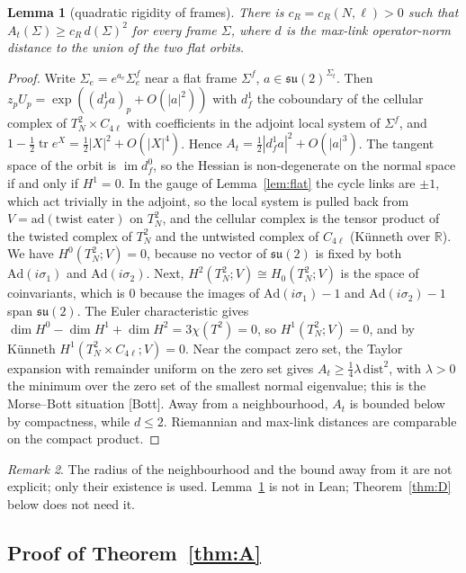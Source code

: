 \documentclass[11pt,a4paper]{article}
\newtheorem{lemma}{Lemma}[section]
\theoremstyle{definition}
\theoremstyle{remark}
\newtheorem{remark}[lemma]{Remark}
\newcommand{\tr}{\operatorname{tr}}
\begin{document}
\begin{lemma}[quadratic rigidity of frames]\label{lem:rigid}
There is $c_R=c_R(N,\ell)>0$ such that $A_t(\Sigma)\ge c_R\,d(\Sigma)^2$ for every frame $\Sigma$, where $d$ is the max-link operator-norm distance to the union of the two flat orbits.
\end{lemma}
\begin{proof}
Write $\Sigma_e=e^{a_e}\Sigma^f_e$ near a flat frame $\Sigma^f$, $a\in\mathfrak{su}(2)^{\Sigma_t}$.
Then $z_pU_p=\exp((d^1_fa)_p+O(|a|^2))$ with $d^1_f$ the coboundary of the cellular complex of $T^2_N\times C_{4\ell}$ with coefficients in the adjoint local system of $\Sigma^f$, and $1-\frac12\tr e^X=\frac12|X|^2+O(|X|^4)$.
Hence $A_t=\frac12|d^1_fa|^2+O(|a|^3)$.
The tangent space of the orbit is $\operatorname{im}d^0_f$, so the Hessian is non-degenerate on the normal space if and only if $H^1=0$.
In the gauge of Lemma~\ref{lem:flat} the cycle links are $\pm1$, which act trivially in the adjoint, so the local system is pulled back from $V=\mathrm{ad}(\text{twist eater})$ on $T^2_N$, and the cellular complex is the tensor product of the twisted complex of $T^2_N$ and the untwisted complex of $C_{4\ell}$ (Künneth over $\mathbb{R}$).
We have $H^0(T^2_N;V)=0$, because no vector of $\mathfrak{su}(2)$ is fixed by both $\mathrm{Ad}(i\sigma_1)$ and $\mathrm{Ad}(i\sigma_2)$.
Next, $H^2(T^2_N;V)\cong H_0(T^2_N;V)$ is the space of coinvariants, which is $0$ because the images of $\mathrm{Ad}(i\sigma_1)-1$ and $\mathrm{Ad}(i\sigma_2)-1$ span $\mathfrak{su}(2)$.
The Euler characteristic gives $\dim H^0-\dim H^1+\dim H^2=3\chi(T^2)=0$, so $H^1(T^2_N;V)=0$, and by Künneth $H^1(T^2_N\times C_{4\ell};V)=0$.
Near the compact zero set, the Taylor expansion with remainder uniform on the zero set gives $A_t\ge\frac14\lambda\,\mathrm{dist}^2$, with $\lambda>0$ the minimum over the zero set of the smallest normal eigenvalue; this is the Morse--Bott situation [Bott].
Away from a neighbourhood, $A_t$ is bounded below by compactness, while $d\le2$.
Riemannian and max-link distances are comparable on the compact product.
\end{proof}

\begin{remark}
The radius of the neighbourhood and the bound away from it are not explicit; only their existence is used. Lemma~\ref{lem:rigid} is not in Lean; Theorem~\ref{thm:D} below does not need it.
\end{remark}

\subsection{Proof of Theorem~\ref{thm:A}}
\end{document}
